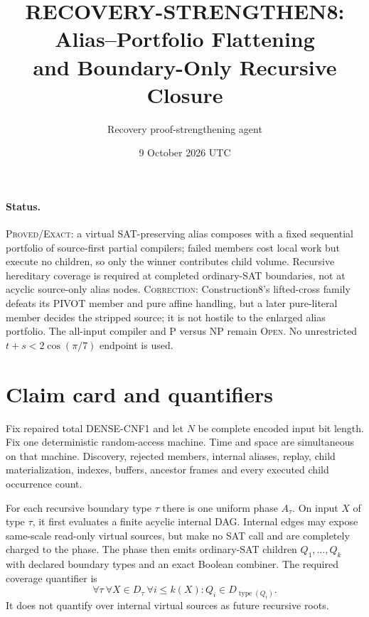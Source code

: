 \documentclass[11pt]{article}
\title{RECOVERY-STRENGTHEN8: Alias--Portfolio Flattening\\and Boundary-Only Recursive Closure}
\author{Recovery proof-strengthening agent}
\date{9 October 2026 UTC}
\begin{document}
\sloppy\maketitle

\paragraph{Status.}
\textsc{Proved/Exact}: a virtual SAT-preserving alias composes with a fixed
sequential portfolio of source-first partial compilers; failed members cost
local work but execute no children, so only the winner contributes child
volume.  Recursive hereditary coverage is required at completed ordinary-SAT
boundaries, not at acyclic source-only alias nodes.  \textsc{Correction}:
Construction8's lifted-cross family defeats its PIVOT member and pure affine
handling, but a later pure-literal member decides the stripped source; it is
not hostile to the enlarged alias portfolio.  The all-input compiler and P
versus NP remain \textsc{Open}.  No unrestricted
$t+s<2\cos(\pi/7)$ endpoint is used.

\section{Claim card and quantifiers}
Fix repaired total DENSE-CNF1 and let $N$ be complete encoded input bit
length.  Fix one deterministic random-access machine.  Time and space are
simultaneous on that machine.  Discovery, rejected members, internal aliases,
replay, child materialization, indexes, buffers, ancestor frames and every
executed child occurrence count.

For each recursive boundary type $\tau$ there is one uniform phase
$A_\tau$.  On input $X$ of type $\tau$, it first evaluates a finite acyclic
internal DAG.  Internal edges may expose same-scale read-only virtual sources,
but make no SAT call and are completely charged to the phase.  The phase then
emits ordinary-SAT children $Q_1,\ldots,Q_k$ with declared boundary types and
an exact Boolean combiner.  The required coverage quantifier is
\begin{equation}
 \forall \tau\ \forall X\in D_\tau\ \forall i\le k(X):
       Q_i\in D_{\operatorname{type}(Q_i)}.               \tag{1}
\end{equation}
It does not quantify over internal virtual sources as future recursive roots.
\end{document}
